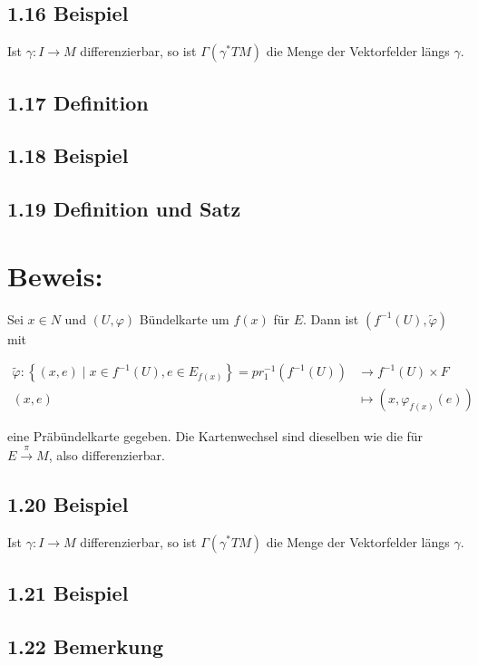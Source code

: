 \subsection*{1.16 Beispiel}
Ist $\gamma: I \rightarrow M$ differenzierbar, so ist $\Gamma\left(\gamma^{*} T M\right)$ die Menge der Vektorfelder längs $\gamma$.

\subsection*{1.17 Definition}

\subsection*{1.18 Beispiel}

\subsection*{1.19 Definition und Satz}

\section*{Beweis:}
Sei $x \in N$ und $(U, \varphi)$ Bündelkarte um $f(x)$ für $E$. Dann ist $\left(f^{-1}(U), \tilde{\varphi}\right)$ mit

$$
\begin{aligned}
\tilde{\varphi}:\left\{(x, e) \mid x \in f^{-1}(U), e \in E_{f(x)}\right\}=p r_{1}^{-1}\left(f^{-1}(U)\right) & \longrightarrow f^{-1}(U) \times F \\
(x, e) & \mapsto\left(x, \varphi_{f(x)}(e)\right)
\end{aligned}
$$

eine Präbündelkarte gegeben. Die Kartenwechsel sind dieselben wie die für $E \xrightarrow{\pi} M$, also differenzierbar.

\subsection*{1.20 Beispiel}
Ist $\gamma: I \rightarrow M$ differenzierbar, so ist $\Gamma\left(\gamma^{*} T M\right)$ die Menge der Vektorfelder längs $\gamma$.


\subsection*{1.21 Beispiel}

\subsection*{1.22 Bemerkung}


